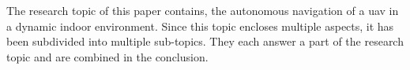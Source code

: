 The research topic of this paper contains, the autonomous navigation of a \acs{uav} in a dynamic indoor environment. Since this topic encloses multiple aspects, it has been subdivided into multiple sub\hyp{}topics. They each answer a part of the research topic and are combined in the conclusion.